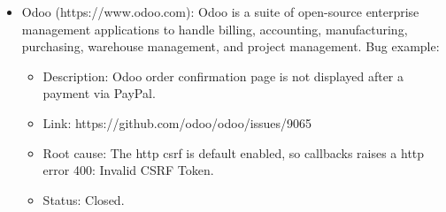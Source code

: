 \begin{itemize}
  \item Odoo (https://www.odoo.com): Odoo is a suite of
  open-source enterprise management applications to handle billing, accounting, manufacturing, purchasing, warehouse
  management, and project management.  Bug example:
  \begin{itemize}
    \item Description: Odoo order confirmation page is not displayed after
    a payment via PayPal.
    \item Link: https://github.com/odoo/odoo/issues/9065
    \item Root cause: The http csrf is default enabled, so callbacks raises a http
    error 400: Invalid CSRF Token.
    \item Status: Closed.
  \end{itemize}
\end{itemize}
